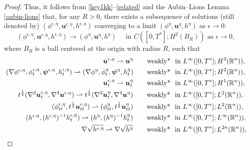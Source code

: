\documentclass[11pt,reqno]{amsart}
\numberwithin{rk}{section}
\numberwithin{prop}{section}
\numberwithin{mydef}{section}
\numberwithin{lem}{section}
\numberwithin{equation}{section}
\numberwithin{thm}{section}
\begin{document}
\begin{proof}
Thus, it follows from  \eqref{key1kk}--\eqref{related}  and  the Aubin--Lions Lemma \ref{aubin-lions}   that, for any $R> 0$,  there exists a subsequence of solutions (still denoted by) $(\phi^{\epsilon,\eta}, \boldsymbol{u}^{\epsilon,\eta},  h^{\epsilon,\eta} )$ converging  to  a limit $(\phi^\eta,  \boldsymbol{u}^\eta,  h^\eta) $ as $\epsilon \to 0$:
\begin{equation}\label{ert1}
(\phi^{\epsilon,\eta}, \boldsymbol{u}^{\epsilon,\eta},  h^{\epsilon,\eta}) \to (\phi^\eta,  \boldsymbol{u}^\eta,  h^\eta ) \quad \text{ in $C([0,T^*];H^2(B_R))$ \ as $\epsilon \to 0$},
\end{equation}
where $B_R$ is a ball centered at the origin with radius $R$, such that 
\begin{align}\label{ruojixian}
\begin{aligned}
\boldsymbol{u}^{\epsilon,\eta}\rightharpoonup   \boldsymbol{u}^\eta \qquad &\text{weakly* \ in } L^\infty([0,T^*];H^3(\mathbb{R}^n)),\\ 
(\nabla  \phi^{\epsilon,\eta},  \phi^{\epsilon,\eta}_t,\boldsymbol{\psi}^{\epsilon,\eta},h^{\epsilon,\eta}_t)\rightharpoonup (\nabla \phi^\eta, \phi^\eta_t,\boldsymbol{\psi}^\eta,h^{\eta}_t) \qquad &\text{weakly* \ in } L^\infty([0,T^*];H^2(\mathbb{R}^n)),\\
\boldsymbol{u}^{\epsilon,\eta}_t \rightharpoonup   \boldsymbol{u}^\eta_t \qquad &\text{weakly* \ in } L^\infty([0,T^*];H^1(\mathbb{R}^n)),\notag
\end{aligned}\hspace{0.8mm}\\
\begin{aligned}
t^{\frac{1}{2}}(\nabla^2\boldsymbol{u}_t^{\epsilon,\eta},\nabla^4\boldsymbol{u}^{\epsilon,\eta}) \rightharpoonup  t^{\frac{1}{2}}(\nabla^2\boldsymbol{u}_t^{\eta}, \nabla^4\boldsymbol{u}^{\eta}) \qquad &\text{weakly* \ in } L^\infty([0,T^*];L^2(\mathbb{R}^n)),\\
(\phi^{\epsilon,\eta}_{tt}, t^{\frac{1}{2}}\boldsymbol{u}^{\epsilon,\eta}_{tt}) \rightharpoonup ( \phi^{\eta}_{tt}, t^{\frac{1}{2}} \boldsymbol{u}^{\eta}_{tt}) \qquad &\text{weakly* \ in } L^\infty([0,T^*];L^2(\mathbb{R}^n)),\\
(h^{\epsilon,\eta},(h^{\epsilon,\eta})^{-1}h^{\epsilon,\eta}_t) \rightharpoonup  (h^{\eta},(h^{\eta})^{-1}h^{\eta}_t) \qquad &\text{weakly* \ in } L^\infty([0,T^*];L^\infty(\mathbb{R}^n)),\\
\nabla\sqrt{h^{\epsilon,\eta}} \rightharpoonup  \nabla \sqrt{h^{\eta}}\qquad  &\text{weakly* \ in } L^\infty([0,T^*];L^{2n}(\mathbb{R}^n)),\\

\end{aligned}
\end{align}
\end{proof}
\end{document}
